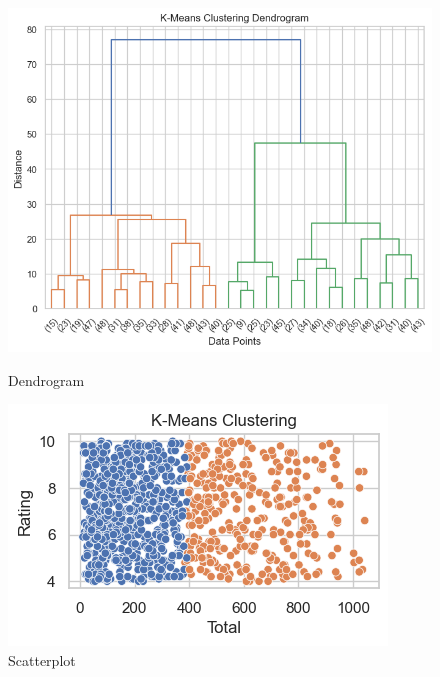 \begin{figure}[h]
    \centering
    \begin{minipage}{0.45\textwidth}
        \centering
        \includegraphics[width=\linewidth]{Chapters/ch8/ch_8_kmeans_dendo.png}
        \caption{Dendrogram}
        \label{fig:dendrogram}
    \end{minipage}\hfill
    \begin{minipage}{0.45\textwidth}
        \centering
        \includegraphics[width=\linewidth]{Chapters/ch8/ch_8_kmeans_scatter.png}
        \caption{Scatterplot}
        \label{fig:scatterplot}
    \end{minipage}
\end{figure}



